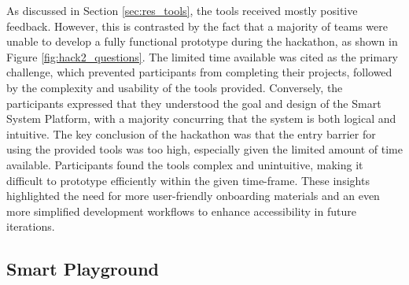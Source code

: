 As discussed in Section \ref{sec:res_tools}, the tools received mostly positive feedback. However, this is contrasted by the fact that a majority of teams were unable to develop a fully functional prototype during the hackathon, as shown in Figure \ref{fig:hack2_questions}. The limited time available was cited as the primary challenge, which prevented participants from completing their projects, followed by the complexity and usability of the tools provided. Conversely, the participants expressed that they understood the goal and design of the Smart System Platform, with a majority concurring that the system is both logical and intuitive. The key conclusion of the hackathon was that the entry barrier for using the provided tools was too high, especially given the limited amount of time available. Participants found the tools complex and unintuitive, making it difficult to prototype efficiently within the given time-frame. These insights highlighted the need for more user-friendly onboarding materials and an even more simplified development workflows to enhance accessibility in future iterations.

\subsection{\label{sec:res_smartplayground}\label{sec:res_honourablementions}Smart Playground}

